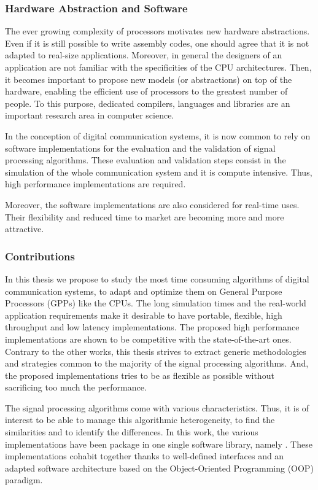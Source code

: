 \subsubsection*{Hardware Abstraction and Software}

The ever growing complexity of processors motivates new hardware abstractions.
Even if it is still possible to write assembly codes, one should agree that it
is not adapted to real-size applications. Moreover, in general the designers of
an application are not familiar with the specificities of the CPU architectures.
Then, it becomes important to propose new models (or abstractions) on top of the
hardware, enabling the efficient use of processors to the greatest number of
people. To this purpose, dedicated compilers, languages and libraries are an
important research area in computer science.

In the conception of digital communication systems, it is now common to rely on
software implementations for the evaluation and the validation of signal
processing algorithms. These evaluation and validation steps consist in
the simulation of the whole communication system and it is compute intensive.
Thus, high performance implementations are required.

Moreover, the software implementations are also considered for real-time uses.
Their flexibility and reduced time to market are becoming more and more
attractive.

\subsubsection*{Contributions}

In this thesis we propose to study the most time consuming algorithms of digital
communication systems, to adapt and optimize them on General Purpose Processors
(GPPs) like the CPUs. The long simulation times and the real-world application
requirements make it desirable to have portable, flexible, high throughput and
low latency implementations. The proposed high performance implementations are
shown to be competitive with the state-of-the-art ones. Contrary to the other
works, this thesis strives to extract generic methodologies and strategies
common to the majority of the signal processing algorithms. And, the proposed
implementations tries to be as flexible as possible without sacrificing too much
the performance.

The signal processing algorithms come with various characteristics. Thus, it is
of interest to be able to manage this algorithmic heterogeneity, to find the
similarities and to identify the differences. In this work, the various
implementations have been package in one single software library, namely
\AFFECT. These implementations cohabit together thanks to well-defined
interfaces and an adapted software architecture based on the Object-Oriented
Programming (OOP) paradigm.

